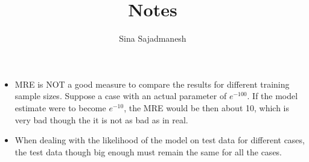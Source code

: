 \documentclass[]{article}
\title{Notes}
\author{Sina Sajadmanesh}
\begin{document}
\maketitle

\begin{itemize}
\item MRE is NOT a good measure to compare the results for different training sample sizes. Suppose a case with an actual parameter of $e^{-100}$. If the model estimate were to become $e^{-10}$, the MRE would be then about 10, which is very bad though the it is not as bad as in real.
\item When dealing with the likelihood of the model on test data for different cases, the test data though big enough must remain the same for all the cases.

\end{itemize}
\end{document}
